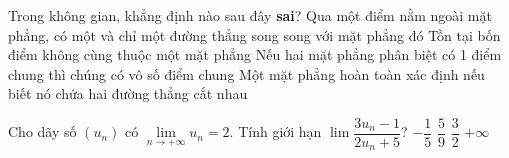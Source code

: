 \begin{ex}%
	Trong không gian, khẳng định nào sau đây \textbf{sai}?
	\choice
	{\True Qua một điểm nằm ngoài mặt phẳng, có một và chỉ một đường thẳng song song với mặt phẳng đó}
	{Tồn tại bốn điểm không cùng thuộc một mặt phẳng}
	{Nếu hai mặt phẳng phân biệt có 1 điểm chung thì chúng có vô số điểm chung}
	{Một mặt phẳng hoàn toàn xác định nếu biết nó chứa hai đường thẳng cắt nhau}
\end{ex}
\begin{ex}%
	Cho dãy số $(u_{n})$ có $\lim\limits_{n \to +\infty}u_{n}=2$. Tính giới hạn $\lim\dfrac{3u_{n}-1}{2 u_{n}+5}$?
	\choice
	{$-\dfrac{1}{5}$}
	{\True $\dfrac{5}{9}$}
	{$\dfrac{3}{2}$}
	{$+\infty$}
\end{ex}

\cauds

